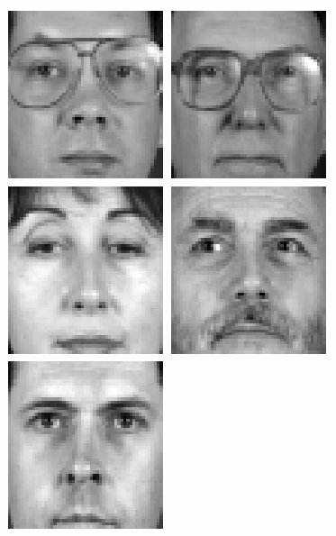 \begin{figure}[ht]
\begin{center}
\includegraphics[scale=0.12]{ch4/figures/XM2VTS_41.png}
\includegraphics[scale=0.12]{ch4/figures/XM2VTS_42.png}
\includegraphics[scale=0.12]{ch4/figures/XM2VTS_43.png}
\includegraphics[scale=0.12]{ch4/figures/XM2VTS_44.png}
\includegraphics[scale=0.12]{ch4/figures/XM2VTS_45.png}

\end{center}
\end{figure}
